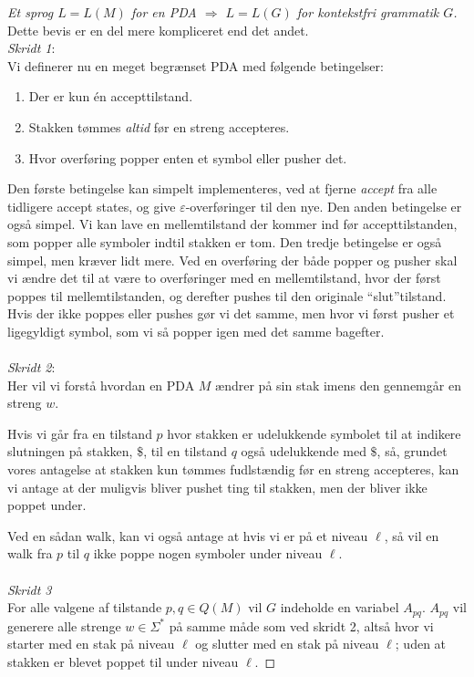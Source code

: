 \begin{proof}[Et sprog $L = L(M)$ for en PDA $\Rightarrow$ $L = L(G)$ for kontekstfri grammatik $G$]
	Dette bevis er en del mere kompliceret end det andet.\\
	\noindent
	\textit{Skridt 1}:\\
	Vi definerer nu en meget begrænset PDA med følgende betingelser:
	\begin{enumerate}
		\item Der er kun én accepttilstand.
		\item Stakken tømmes \textit{altid} før en streng accepteres.
		\item Hvor overføring popper enten et symbol eller pusher det.
	\end{enumerate}

	Den første betingelse kan simpelt implementeres, ved at fjerne \textit{accept} fra alle tidligere accept states, og give \(\varepsilon\)-overføringer til den nye.
	Den anden betingelse er også simpel. Vi kan lave en mellemtilstand der kommer ind før accepttilstanden, som popper alle symboler indtil stakken er tom. Den tredje betingelse er også simpel, men kræver lidt mere. Ved en overføring der både popper og pusher skal vi ændre det til at være to overføringer med en mellemtilstand, hvor der først poppes til mellemtilstanden, og derefter pushes til den originale ``slut''tilstand. Hvis der ikke poppes eller pushes gør vi det samme, men hvor vi først pusher et ligegyldigt symbol, som vi så popper igen med det samme bagefter.\\\\
	\noindent
	\textit{Skridt 2}:\\
	Her vil vi forstå hvordan en PDA $M$ ændrer på sin stak imens den gennemgår en streng $w$.

	Hvis vi går fra en tilstand $p$ hvor stakken er udelukkende symbolet til at indikere slutningen på stakken, $\mathdollar$, til en tilstand $q$ også udelukkende med $\mathdollar$, så, grundet vores antagelse at stakken kun tømmes fudlstændig før en streng accepteres, kan vi antage at der muligvis bliver pushet ting til stakken, men der bliver ikke poppet under.

	Ved en sådan walk, kan vi også antage at hvis vi er på et niveau \(\ell\), så vil en walk fra $p$ til $q$ ikke poppe nogen symboler under niveau \(\ell\).\\\\
	\textit{Skridt 3}\\
	\noindent
	For alle valgene af tilstande $p, q \in Q(M)$ vil $G$ indeholde en variabel $A_{pq}$. $A_{pq}$ vil generere alle strenge $w \in \Sigma^{*}$ på samme måde som ved skridt 2, altså hvor vi starter med en stak på niveau \(\ell\) og slutter med en stak på niveau \(\ell\); uden at stakken er blevet poppet til under niveau \(\ell\).


\end{proof}
